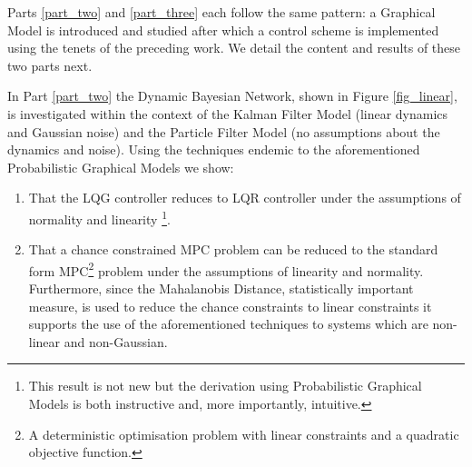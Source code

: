 Parts \ref{part_two} and \ref{part_three} each follow the same pattern: a Graphical Model is introduced and studied after which a control scheme is implemented using the tenets of the preceding work. We detail the content and results of these two parts next.

In Part \ref{part_two} the Dynamic Bayesian Network, shown in Figure \ref{fig_linear}, is investigated within the context of the Kalman Filter Model (linear dynamics and Gaussian noise) and the Particle Filter Model (no assumptions about the dynamics and noise). Using the techniques endemic to the aforementioned Probabilistic Graphical Models we show:
\begin{enumerate}
\item
That the LQG controller reduces to LQR controller under the assumptions of normality and linearity \footnote{This result is not new but the derivation using Probabilistic Graphical Models is both instructive and, more importantly, intuitive.}.
\item
That a chance constrained MPC problem can be reduced to the standard form MPC\footnote{A deterministic optimisation problem with linear constraints and a quadratic objective function.} problem under the assumptions of linearity and normality. Furthermore, since the Mahalanobis Distance, statistically important measure, is used to reduce the chance constraints to linear constraints it supports the use of the aforementioned techniques to systems which are non-linear and non-Gaussian. 
\end{enumerate}

